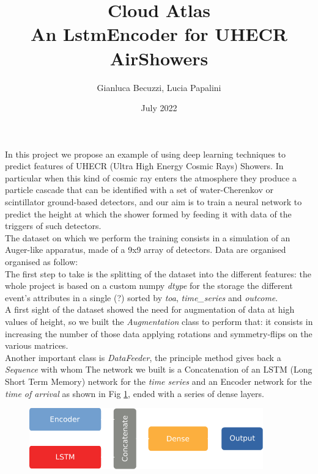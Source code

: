 \documentclass{article}
\title{Cloud Atlas \\[1ex] \large An LstmEncoder for UHECR AirShowers}
\author{Gianluca Becuzzi, Lucia Papalini}
\date{July 2022}
\begin{document}
\maketitle

In this project we propose an example of using deep learning techniques to predict features of UHECR 
(Ultra High Energy Cosmic Rays) Showers.
In particular when this kind of cosmic ray enters the atmosphere they produce a particle cascade 
that can be identified with a set of water-Cherenkov or scintillator ground-based detectors, and our aim
 is to train a neural network to predict the height at which the shower formed by feeding it with data 
 of the triggers of such detectors.\\
The dataset on which we perform the training consists in a simulation of an Auger-like apparatus, 
made of a 9x9 array of detectors.  Data are organised organised as follow:
\\
The first step to take is the splitting of the dataset into the different features:
 the whole project is based on a custom numpy \textit{dtype} for the storage the different event's attributes
  in a single (?) sorted by \textit{toa}, \textit{time\_series} and \textit{outcome}.\\
A first sight of the dataset showed the need for augmentation of data at high values of height,
 so we built the \textit{Augmentation} class to perform that: it consists in increasing the 
 number of those data applying rotations and symmetry-flips on the various matrices.\\
Another important class is \textit{DataFeeder}, the principle method gives back a \textit{Sequence} with whom  
The network we built is a Concatenation of an LSTM (Long Short Term Memory) network 
for the \textit{time series} and an Encoder network for the \textit{time of arrival} as 
shown in Fig \ref{fig:network}, ended with a series of dense layers.
\begin{figure}
    \centering
    \includegraphics[width=0.9\textwidth]{figures/net_idea.pdf}
    \label{fig:network}
\end{figure}
\end{document}
